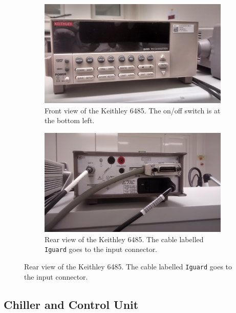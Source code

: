 \documentclass[a4paper]{article}
\begin{document}
\begin{figure}[hbtp]
\centering
\begin{subfigure}[t]{0.475\textwidth}
\centering\captionsetup{width=.8\linewidth}%
\includegraphics[width=\linewidth]{pictures/front_keithley64.jpg}
\caption[Front View of the Keithley 6485]{Front view of the Keithley 6485. The on/off switch is at the bottom left.}
\label{fig:keithley6485front}
\end{subfigure}
\begin{subfigure}[t]{0.475\textwidth}
\centering\captionsetup{width=.8\linewidth}%
\includegraphics[width=\linewidth]{pictures/back_keithley64.jpg}
\caption[Back View of the Keithley 6485]{Rear view of the Keithley 6485. The cable labelled {\tt Iguard} goes to the input connector.}
\label{fig:keithley6485rear}
\end{subfigure}
\end{figure}

\subsection{Chiller and Control Unit}
\label{sec:chiller}
\end{document}
